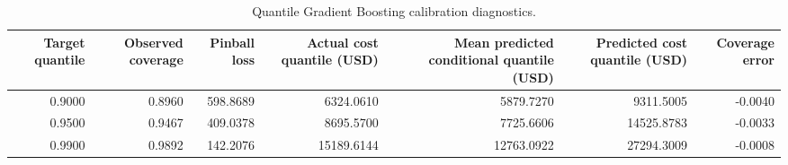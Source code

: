 \begin{table}
\caption{Quantile Gradient Boosting calibration diagnostics.}
\label{tab:05-gb-quantile-summary}
\begin{tabular}{rrrrrrr}
\toprule
Target quantile & Observed coverage & Pinball loss & Actual cost quantile (USD) & Mean predicted conditional quantile (USD) & Predicted cost quantile (USD) & Coverage error \\
\midrule
0.9000 & 0.8960 & 598.8689 & 6324.0610 & 5879.7270 & 9311.5005 & -0.0040 \\
0.9500 & 0.9467 & 409.0378 & 8695.5700 & 7725.6606 & 14525.8783 & -0.0033 \\
0.9900 & 0.9892 & 142.2076 & 15189.6144 & 12763.0922 & 27294.3009 & -0.0008 \\
\bottomrule
\end{tabular}
\end{table}
